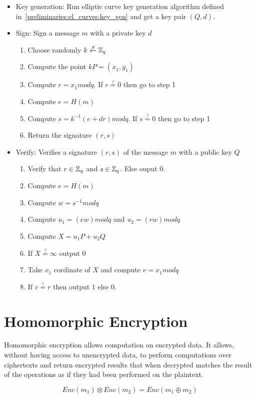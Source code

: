 \begin{itemize}
  \item Key generation: Run elliptic curve key generation algorithm defined in~\ref{preliminaries:el_curves:key_gen} and get a key pair $(Q, d)$.
  \item Sign: Sign a message $m$ with a private key $d$
    \begin{enumerate}
      \item Choose randomly $k \xleftarrow{\mathtt{r}}{\mathbb{Z}_q}$
      \item Compute the point $kP = (x_1, y_1)$
      \item Compute $r = x_1modq$. If $r \stackrel{?}{=} 0$ then go to step 1
      \item Compute $e = H(m)$
      \item Compute $s = k^{-1} (e + dr) modq$. If $s \stackrel{?}{=} 0$ then go to step 1
      \item Return the signature $(r, s)$
    \end{enumerate}
  \item Verify: Verifies a signature $(r, s)$ of the message $m$ with a public key $Q$
    \begin{enumerate}
      \item Verify that $r \in \mathbb{Z}_q$ and $s \in \mathbb{Z}_q$. Else ouput $0$.
      \item Compute $e = H(m)$
      \item Compute $w = s^{-1}modq$
      \item Compute $u_1 = (ew)modq$ and $u_2 = (rw)modq$
      \item Compute $X = u_1P + u_2Q$
      \item If $X \stackrel{?}{=} \infty$ output $0$
      \item Take $x_1$ cordinate of $X$ and compute $v = x_1modq$
      \item If $v \stackrel{?}{=} r$ then output $1$ else $0$.
    \end{enumerate}
\end{itemize}

\section{Homomorphic Encryption}
\label{preliminaries:homo}

Homomorphic encryption allows computation on encrypted data. It allows, without having access to unencrypted data, to perform computations over ciphertexts and return encrypted results that when decrypted matches the result of the operations as if they had been performed on the plaintext.

\begin{equation*}
  Enc(m_1) \otimes Enc(m_2) = Enc(m_1 \oplus m_2)
\end{equation*}
